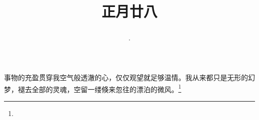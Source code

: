 \title{\date[d=8,m=3,y=2024][year:cn-y,年,month:cn,day:cn,日,·,weekday]·正月廿八 }
事物的充盈贯穿我空气般透澈的心，仅仅观望就足够温情。我从来都只是无形的幻梦，褪去全部的灵魂，空留一缕倏来忽往的漂泊的微风。\footnote{ }

